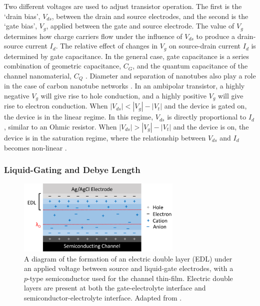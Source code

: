 \documentclass[
  a4paper,
]{scrbook}
\begin{document}
Two different voltages are used to adjust transistor operation. The
first is the `drain bias', \(V_{ds}\), between the drain and source
electrodes, and the second is the `gate bias', \(V_g\), applied between
the gate and source electrode. The value of \(V_g\) determines how
charge carriers flow under the influence of \(V_{ds}\) to produce a
drain-source current \(I_d\). The relative effect of changes in \(V_g\)
on source-drain current \(I_d\) is determined by gate capacitance. In
the general case, gate capacitance is a series combination of geometric
capacitance, \(C_{G}\), and the quantum capacitance of the channel
nanomaterial, \(C_{Q}\)
\autocite{Avouris2007,Cao2009,Heller2009a,Tran2016,Kireev2017,Li2023}.
Diameter and separation of nanotubes also play a role in the case of
carbon nanotube networks \autocite{Rouhi2011a}. In an ambipolar
transistor, a highly negative \(V_g\) will give rise to hole conduction,
and a highly positive \(V_g\) will give rise to electron
conduction\autocite{Avouris2007,Yao2021,Li2023}. When
\(|V_{ds}| < |V_g| - |V_t|\) and the device is gated on, the device is
in the linear regime. In this regime, \(V_{ds}\) is directly
proportional to \(I_{d}\), similar to an Ohmic resistor. When
\(|V_{ds}| > |V_g| - |V_t|\) and the device is on, the device is in the
saturation regime, where the relationship between \(V_{ds}\) and
\(I_{d}\) becomes non-linear \autocite{Petti2016,Shkodra2021,Li2023}.

\hypertarget{liquid-gating-and-debye-length}{%
\subsubsection*{Liquid-Gating and Debye
Length}\label{liquid-gating-and-debye-length}}

\begin{figure}

{\centering \includegraphics[width=0.7\textwidth,height=\textheight]{figures/ch2/Debye-length-schematic-alt.png}

}

\caption{\label{fig-Debye-length}A diagram of the formation of an
electric double layer (EDL) under an applied voltage between source and
liquid-gate electrodes, with a \(p\)-type semiconductor used for the
channel thin-film. Electric double layers are present at both the
gate-electrolyte interface and semiconductor-electrolyte interface.
Adapted from \autocite{Ohno2015,Shkodra2021,Tiwari2022}.}

\end{figure}
\end{document}
